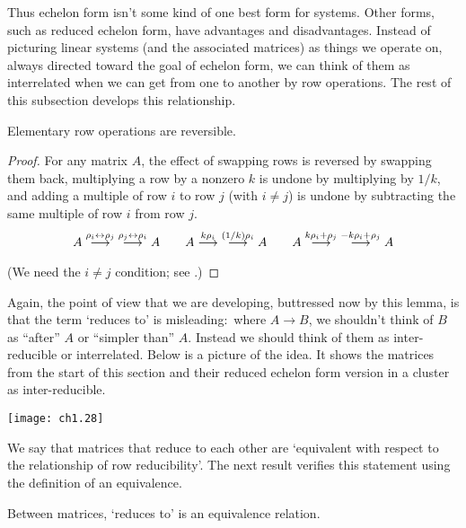 Thus echelon form isn't some kind of one best form for systems.
Other forms, such as reduced echelon form,  have advantages and
disadvantages.
Instead of picturing linear systems (and the associated matrices) 
as things we operate on, 
always directed toward the goal of echelon form, we can think of 
them as interrelated when
we can get from one to another by row operations.
The rest of this subsection develops this relationship.

\begin{lemma} \label{le:RowOpsRev}
Elementary row operations are reversible.
\end{lemma}

\begin{proof}
For any matrix \( A \),
the effect of swapping rows is reversed by swapping them back,
multiplying a row by a nonzero \( k \) is undone by multiplying by
$1/k$,
and adding a multiple of row \( i \) to row \( j \) (with $i\neq j$)
is undone by subtracting the same multiple of row \( i \) from row \( j \).
\begin{equation*}
      A
     \mathrel{ \mathop{\longrightarrow}\limits^{\rho_i\leftrightarrow\rho_j\mathstrut}_{ \begin{subarray}{l} \relax \end{subarray}}}
     \;\mathrel{ \mathop{\longrightarrow}\limits^{\rho_j\leftrightarrow\rho_i\mathstrut}_{ \begin{subarray}{l} \relax \end{subarray}}}
      A
  \qquad
        A
     \mathrel{ \mathop{\longrightarrow}\limits^{k\rho_i\mathstrut}_{ \begin{subarray}{l} \relax \end{subarray}}}
     \;\mathrel{ \mathop{\longrightarrow}\limits^{(1/k)\rho_i\mathstrut}_{ \begin{subarray}{l} \relax \end{subarray}}}
      A
  \qquad
        A
     \mathrel{ \mathop{\longrightarrow}\limits^{k\rho_i+\rho_j\mathstrut}_{ \begin{subarray}{l} \relax \end{subarray}}}
     \;\mathrel{ \mathop{\longrightarrow}\limits^{-k\rho_i+\rho_j\mathstrut}_{ \begin{subarray}{l} \relax \end{subarray}}}
      A                          
\end{equation*}
(We need the $i\neq j$ condition;
see .)
\end{proof}

Again, the point of view that we are developing, buttressed now by this lemma,
is that the term `reduces to' is misleading:~where
\( A\longrightarrow B \), we shouldn't think of \( B \) as
``after'' \( A \) or ``simpler than'' $A$.
Instead we should think of them as inter-reducible or interrelated.
Below is a picture of the idea.
It shows the matrices from the start of this section and their
reduced echelon form version in a cluster as
inter-reducible. 
\begin{center}  
  \texttt{[image: ch1.28]}
\end{center}

We say 
that matrices that reduce to each other are `equivalent with respect
to the relationship of row reducibility'.
The next result verifies this statement using the definition of 
an equivalence.

\begin{lemma}
Between matrices, `reduces to' is an equivalence re\-la\-tion.
\end{lemma}

